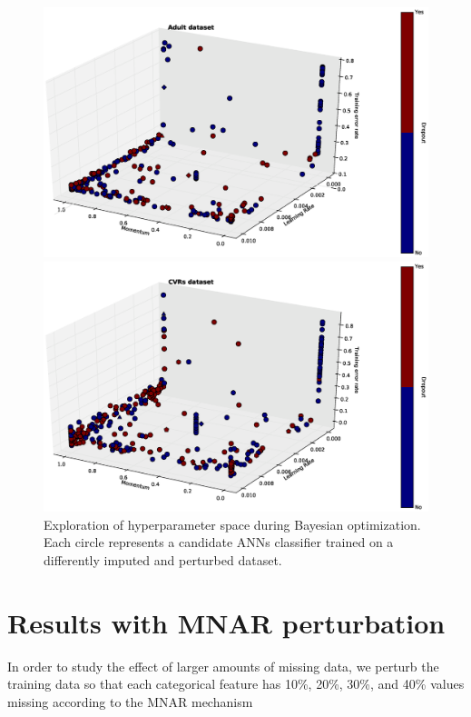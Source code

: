 \documentclass[10pt]{book}
\theoremstyle{definition}
\begin{document}
\begin{figure}[h!]
\includegraphics [scale=0.4, center, center]{figure/params3d_adult.eps}\par
\includegraphics [scale=0.4, center, center]{figure/params3d_votes.eps}\par
\caption{\footnotesize Exploration of hyperparameter space during Bayesian optimization. Each circle represents a candidate ANNs classifier trained on a differently imputed and perturbed dataset.}
   \label{fig:params}
\end{figure}

\clearpage
\section{Results with MNAR perturbation}
\setcounter{equation}{0}

In order to study the effect of larger amounts of missing data, we perturb the training data so that each categorical feature has 10\%, 20\%, 30\%, and 40\% values missing according to the MNAR mechanism
 
\end{document}
